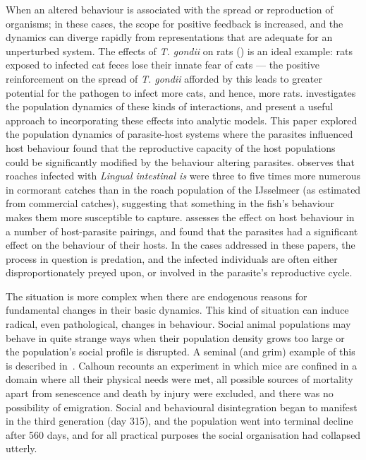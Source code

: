 When an altered behaviour is associated with the spread or
reproduction of organisms; in these cases, the scope for positive
feedback is increased, and the dynamics can diverge rapidly from
representations that are adequate for an unperturbed system.  The
effects of \emph{T. gondii} on rats (\citep{beady2000fatal}) is an
ideal example: rats exposed to infected cat feces lose their innate
fear of cats --- the positive reinforcement on the spread
of \emph{T. gondii} afforded by this leads to greater potential for
the pathogen to infect more cats, and hence, more
rats.  investigates the population
dynamics of these kinds of interactions, and present a useful approach
to incorporating these effects into analytic models. This paper
explored the population dynamics of parasite-host systems where the
parasites influenced host behaviour found that the reproductive
capacity of the host populations could be significantly modified by
the behaviour altering parasites.  observes that
roaches infected with \emph{Lingual intestinal is} were three to five
times more numerous in cormorant catches than in the roach population
of the IJsselmeer (as estimated from commercial catches), suggesting
that something in the fish's behaviour makes them more susceptible to
capture. \Cite{poulin1994meta} assesses the effect on host behaviour
in a number of host-parasite pairings, and found that the parasites
had a significant effect on the behaviour of their hosts.  In the
cases addressed in these papers, the process in question is predation,
and the infected individuals are often either disproportionately
preyed upon, or involved in the parasite's reproductive cycle.

The situation is more complex when there are endogenous reasons for
fundamental changes in their basic dynamics. This kind of situation
can induce radical, even pathological, changes in behaviour.  Social
animal populations may behave in quite strange ways when their
population density grows too large or the population's social profile
is disrupted.  A seminal (and grim) example of this is described
in~\cite{calhoun1973death}. Calhoun recounts an experiment in which
mice are confined in a domain where all their physical needs were met,
all possible sources of mortality apart from senescence and death by
injury were excluded, and there was no possibility of emigration.
Social and behavioural disintegration began to manifest in the third
generation (day 315), and the population went into terminal decline
after 560 days, and for all practical purposes the social organisation
had collapsed utterly.

